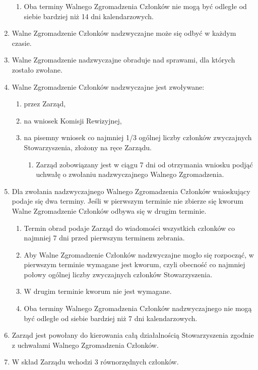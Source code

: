 \documentclass{article}
\begin{document}
\begin{enumerate}
\begin{enumerate}
        \item Oba terminy Walnego Zgromadzenia Członków nie mogą być odległe od siebie bardziej niż 14 dni kalendarzowych.
      \end{enumerate}
    \item Walne Zgromadzenie Członków nadzwyczajne może się odbyć w każdym czasie.
    \item Walne Zgromadzenie nadzwyczajne obraduje nad sprawami, dla których zostało zwołane.
    \item Walne Zgromadzenie Członków nadzwyczajne jest zwoływane:
      \begin{enumerate}
        \item przez Zarząd,
        \item na wniosek Komisji Rewizyjnej,
        \item na pisemny wniosek co najmniej 1/3 ogólnej liczby członków zwyczajnych Stowarzyszenia, złożony na ręce Zarządu.
          \begin{enumerate}
            \item Zarząd zobowiązany jest w ciągu 7 dni od otrzymania wniosku podjąć uchwałę o zwołaniu nadzwyczajnego Walnego Zgromadzenia.
          \end{enumerate}
        \end{enumerate}
    \item Dla zwołania nadzwyczajnego Walnego Zgromadzenia Członków wnioskujący podaje się dwa terminy. Jeśli w pierwszym terminie nie zbierze się kworum Walne Zgromadzenie Członków odbywa się w drugim terminie.
      \begin{enumerate}
        \item Termin obrad podaje Zarząd do wiadomości wszystkich członków co najmniej 7 dni przed pierwszym terminem zebrania.
        \item Aby Walne Zgromadzenie Członków nadzwyczajne mogło się rozpocząć, w pierwszym terminie wymagane jest kworum, czyli obecność co najmniej połowy ogólnej liczby zwyczajnych członków Stowarzyszenia.
        \item W drugim terminie kworum nie jest wymagane.
        \item Oba terminy Walnego Zgromadzenia Członków nadzwyczajnego nie mogą być odległe od siebie bardziej niż 7 dni kalendarzowych.
      \end{enumerate}
    \item Zarząd jest powołany do kierowania całą działalnością Stowarzyszenia zgodnie z uchwałami Walnego Zgromadzenia Członków.
    \item W skład Zarządu wchodzi 3 równorzędnych członków.

\end{enumerate}
\end{document}
